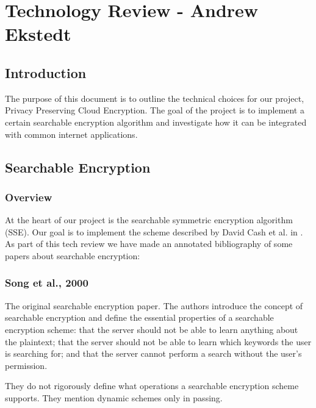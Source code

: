 
\chapter{Technology Review - Andrew Ekstedt}

\section{ Introduction }

The purpose of this document is to outline the technical choices for our project, Privacy Preserving Cloud Encryption. The goal of the project is to implement a certain searchable encryption algorithm and investigate how it can be integrated with common internet applications.


\section{ Searchable Encryption }

\subsection{ Overview }

At the heart of our project is the searchable symmetric encryption algorithm (SSE).
Our goal is to implement the scheme described by David Cash et al. in \cite{cash14}. As part of this tech review we have made an annotated bibliography of some papers about searchable encryption:


\subsection{Song et al., 2000}

\cite{song00} 

The original searchable encryption paper.
The authors introduce the concept of searchable encryption and define the essential properties of a searchable encryption scheme:
that the server should not be able to learn anything about the plaintext;
that the server should not be able to learn which keywords the user is searching for;
and that the server cannot perform a search without the user's permission.

They do not rigorously define what operations a searchable encryption scheme supports. They mention dynamic schemes only in passing.

